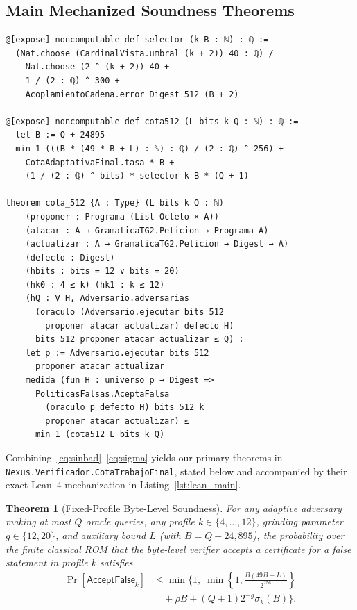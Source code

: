 \documentclass[conference]{IEEEtran}
\newtheorem{theorem}{Theorem}
\theoremstyle{definition}
\begin{document}
\subsection{Main Mechanized Soundness Theorems}
\begin{lstlisting}[float=t, language=Lean4, caption={Main mechanized soundness bound in Lean~4 (\texttt{CotaTrabajoFinal.lean}).}, label={lst:lean_main}]
@[expose] noncomputable def selector (k B : ℕ) : ℚ :=
  (Nat.choose (CardinalVista.umbral (k + 2)) 40 : ℚ) /
    Nat.choose (2 ^ (k + 2)) 40 +
    1 / (2 : ℚ) ^ 300 +
    AcoplamientoCadena.error Digest 512 (B + 2)

@[expose] noncomputable def cota512 (L bits k Q : ℕ) : ℚ :=
  let B := Q + 24895
  min 1 (((B * (49 * B + L) : ℕ) : ℚ) / (2 : ℚ) ^ 256) +
    CotaAdaptativaFinal.tasa * B +
    (1 / (2 : ℚ) ^ bits) * selector k B * (Q + 1)

theorem cota_512 {A : Type} (L bits k Q : ℕ)
    (proponer : Programa (List Octeto × A))
    (atacar : A → GramaticaTG2.Peticion → Programa A)
    (actualizar : A → GramaticaTG2.Peticion → Digest → A)
    (defecto : Digest)
    (hbits : bits = 12 ∨ bits = 20)
    (hk0 : 4 ≤ k) (hk1 : k ≤ 12)
    (hQ : ∀ H, Adversario.adversarias
      (oraculo (Adversario.ejecutar bits 512
        proponer atacar actualizar) defecto H)
      bits 512 proponer atacar actualizar ≤ Q) :
    let p := Adversario.ejecutar bits 512
      proponer atacar actualizar
    medida (fun H : universo p → Digest =>
      PoliticasFalsas.AceptaFalsa
        (oraculo p defecto H) bits 512 k
        proponer atacar actualizar) ≤
      min 1 (cota512 L bits k Q)
\end{lstlisting}

Combining~\eqref{eq:sinbad}--\eqref{eq:sigma} yields our primary theorems in \texttt{Nexus.Verificador.CotaTrabajoFinal}, stated below and accompanied by their exact Lean~4 mechanization in Listing~\ref{lst:lean_main}.

\begin{theorem}[Fixed-Profile Byte-Level Soundness]
\label{thm:fixed}
For any adaptive adversary making at most $Q$ oracle queries, any profile $k \in \{4, \dots, 12\}$, grinding parameter $g \in \{12, 20\}$, and auxiliary bound $L$ (with $B = Q + 24{,}895$), the probability over the finite classical ROM that the byte-level verifier accepts a certificate for a false statement in profile $k$ satisfies
\begin{equation}
\label{eq:bound_fixed}
\begin{aligned}
\Pr[\mathsf{AcceptFalse}_k] &\le \min\biggl\{1,\;
\min\left\{1, \frac{B(49B + L)}{2^{256}}\right\} \\
&\quad + \rho B + (Q + 1)2^{-g}\sigma_k(B)\biggr\}.
\end{aligned}
\end{equation}
\end{theorem}
\end{document}
